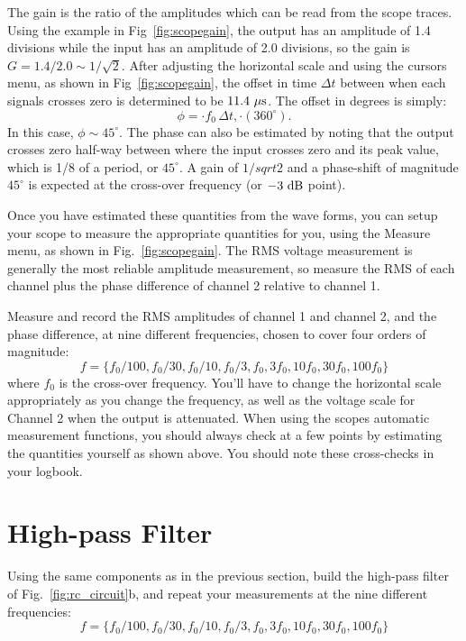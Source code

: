 The gain is the ratio of the amplitudes which can be read from the
scope traces.  Using the example in Fig~\ref{fig:scopegain}, the
output has an amplitude of 1.4 divisions while the input has an
amplitude of 2.0 divisions, so the gain is $G = 1.4/2.0 \sim
1/\sqrt{2}$.  After adjusting the horizontal scale and using the cursors menu, as
shown in Fig~\ref{fig:scopegain}, the offset in time $\Delta t$
between when each signals crosses zero is determined to be $11.4~\rm
\mu s$.  The offset in degrees is simply: 
\begin{displaymath}
\phi = \cdot f_0 \, \Delta t, \cdot (360^\circ).
\end{displaymath}
In this case, $\phi \sim 45^\circ$.  The phase can also be estimated
by noting that the output crosses zero half-way between where the
input crosses zero and its peak value, which is 1/8 of a period, or
$45^\circ$.  A gain of $1/sqrt{2}$ and a phase-shift of magnitude
$45^\circ$ is expected at the cross-over frequency (or $-3~\rm dB$
point).

Once you have estimated these quantities from the wave forms, you can
setup your scope to measure the appropriate quantities for you, using
the Measure menu, as shown in Fig.~\ref{fig:scopegain}.  The RMS
voltage measurement is generally the most reliable amplitude
measurement, so measure the RMS of each channel plus the phase
difference of channel 2 relative to channel 1.

Measure and record the RMS amplitudes of channel 1 and channel 2, and the phase difference, at 
nine different frequencies, chosen to cover four orders of magnitude:
\begin{displaymath}
f=\{f_0/100, f_0/30, f_0/10, f_0/3,f_0, 3f_0, 10f_0, 30f_0, 100f_0\}
\end{displaymath}
where $f_0$ is the cross-over frequency.  You'll have to change the
horizontal scale appropriately as you change the frequency, as well as
the voltage scale for Channel 2 when the output is attenuated.  When
using the scopes automatic measurement functions, you should always
check at a few points by estimating the quantities yourself as shown
above.  You should note these cross-checks in your logbook.

\section{High-pass Filter}

Using the same components as in the previous section, build the
high-pass filter of Fig.~\ref{fig:rc_circuit}b, and repeat your
measurements at the nine different frequencies:
\begin{displaymath}
f=\{f_0/100, f_0/30, f_0/10, f_0/3,f_0, 3f_0, 10f_0, 30f_0, 100f_0\}
\end{displaymath}

